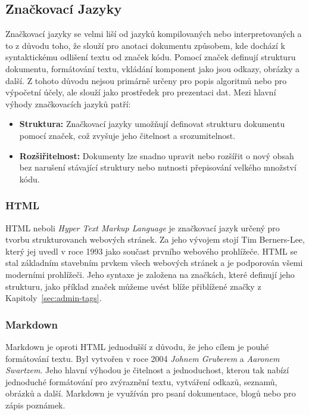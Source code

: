 \subsection{Značkovací Jazyky}
\label{subsec:languages-markup}
Značkovací jazyky se velmi liší od jazyků kompilovaných nebo interpretovaných a to z důvodu toho, že slouží pro anotaci dokumentu způsobem, kde dochází k syntaktickému odlišení textu od značek kódu. Pomocí značek definují strukturu dokumentu, formátování textu, vkládání komponent jako jsou odkazy, obrázky a další. Z tohoto důvodu nejsou primárně určeny pro popis algoritmů nebo pro výpočetní účely, ale slouží jako prostředek pro prezentaci dat. Mezi hlavní výhody značkovacích jazyků patří:

\begin{itemize}
    \item \textbf{Struktura:} Značkovací jazyky umožňují definovat strukturu dokumentu pomocí značek, což zvyšuje jeho čitelnost a srozumitelnost.
    \item \textbf{Rozšiřitelnost:} Dokumenty lze snadno upravit nebo rozšířit o nový obsah bez narušení stávající struktury nebo nutnosti přepisování velkého množství kódu.
\end{itemize}

\subsubsection*{HTML}
\label{subsubsec:languages-markup-html}
HTML neboli \textit{Hyper Text Markup Language} je značkovací jazyk určený pro tvorbu strukturovanch webových stránek. Za jeho vývojem stojí Tim Berners-Lee, který jej uvedl v roce 1993 jako součast prvního webového prohlížeče. HTML se stal základním stavebním prvkem všech webových stránek a je podporován všemi moderními prohlížeči. Jeho syntaxe je založena na značkách, které definují jeho strukturu, jako příklad značek můžeme uvést blíže přiblížené značky z Kapitoly~\ref{sec:admin-tags}.

\subsubsection*{Markdown}
\label{subsubsec:languages-markup-markdown}
Markdown je oproti HTML jednodušší z důvodu, že jeho cílem je pouhé formátování textu. Byl vytvořen v roce 2004 \textit{Johnem Gruberem} a \textit{Aaronem Swartzem}. Jeho hlavní výhodou je čitelnost a jednoduchost, kterou tak nabízí jednoduché formátování pro zvýraznění textu, vytváření odkazů, seznamů, obrázků a další. Markdown je využíván pro psaní dokumentace, blogů nebo pro zápis poznámek.

